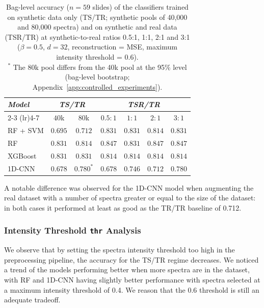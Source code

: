 \documentclass[12pt]{article}
\theoremstyle{paper}
\begin{document}
\begin{table}[H]
\centering
\small
\begin{tabular*}{\textwidth}{@{\extracolsep{\fill}}lcccccc}
\toprule
\multirow{2}{*}{\emph{Model}} & \multicolumn{2}{c}{\emph{TS/TR}} & \multicolumn{4}{c}{\emph{TSR/TR}} \\
\cmidrule(lr){2-3} \cmidrule(lr){4-7}
 & $40$k & $80$k & $0.5{:}1$ & $1{:}1$ & $2{:}1$ & $3{:}1$ \\
\midrule
RF + SVM & $0.695$ & $0.712$ & $0.831$ & $0.831$ & $0.814$ & $0.831$ \\
RF & $0.831$ & $0.814$ & $0.847$ & $0.831$ & $0.847$ & $0.847$ \\
XGBoost & $0.831$ & $0.831$ & $0.814$ & $0.814$ & $0.814$ & $0.814$ \\
1D-CNN & $0.678$ & $0.780^{*}$ & $0.678$ & $0.746$ & $0.712$ & $0.780$ \\
\bottomrule
\end{tabular*}
\caption{\small Bag-level accuracy ($n=59$ slides) of the classifiers trained on synthetic data only (TS/TR; synthetic pools of 40,000 and 80,000 spectra) and on synthetic and real data (TSR/TR) at synthetic-to-real ratios 0.5:1, 1:1, 2:1 and 3:1 ($\beta=0.5$, $d=32$, reconstruction = MSE, maximum intensity threshold = 0.6). \\ $^{*}$ The 80k pool differs from the 40k pool at the 95\% level (bag-level bootstrap; Appendix~\ref{app:controlled_experiments}).}
\label{tab:synth_ratio_results}
\end{table}

A notable difference was observed for the 1D-CNN model when augmenting the real dataset with a number of spectra greater or equal to the size of the dataset: in both cases it performed at least as good as the TR/TR baseline of 0.712.

\subsubsection{Intensity Threshold \texttt{thr} Analysis}
We observe that by setting the spectra intensity threshold too high in the preprocessing pipeline, the accuracy for the TS/TR regime decreases. We noticed a trend of the models performing better when more spectra are in the dataset, with RF and 1D-CNN having slightly better performance with spectra selected at a maximum intensity threshold of 0.4. We reason that the 0.6 threshold is still an adequate tradeoff.
\end{document}

